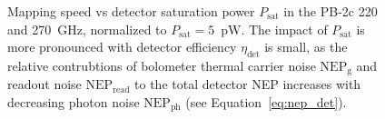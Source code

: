 \begin{figure}
    \centering
    \caption{Mapping speed vs detector saturation power $P_{\mathrm{sat}}$ in the PB-2c 220 and 270~GHz, normalized to $P_{\mathrm{sat}} = 5$~pW. The impact of $P_{\mathrm{sat}}$ is more pronounced with detector efficiency $\eta_{\mathrm{det}}$ is small, as the relative contrubtions of bolometer thermal carrier noise $\mathrm{NEP_{g}}$ and readout noise $\mathrm{NEP_{read}}$ to the total detector NEP increases with decreasing photon noise $\mathrm{NEP_{ph}}$ (see Equation~\ref{eq:nep_det}).}
    \label{fig:pb2c_psat_ms}
\end{figure}

